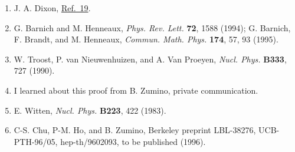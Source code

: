 \begin{enumerate}
\item {}\label{ch22-ref-21}
J. A. Dixon, \hyperref[ch22-ref-19]{Ref.~19}.

\item {}\label{ch22-ref-22}
G. Barnich and M. Henneaux, \emph{Phys. Rev. Lett.} \textbf{72}, 1588
(1994); G. Barnich, F. Brandt, and M. Henneaux,
\emph{Commun. Math. Phys.} \textbf{174}, 57, 93 (1995).

\item {}\label{ch22-ref-23}
W. Troost, P. van Nieuwenhuizen, and A. Van Proeyen,
\emph{Nucl. Phys.} \textbf{B333}, 727 (1990).

\item {}\label{ch22-ref-24}
I learned about this proof from B. Zumino, private communication.

\item {}\label{ch22-ref-25}
E. Witten, \emph{Nucl. Phys.} \textbf{B223}, 422 (1983).

\item {}\label{ch22-ref-26}
C-S. Chu, P-M. Ho, and B. Zumino, Berkeley preprint LBL-38276,
UCB-PTH-96/05, hep-th/9602093, to be published (1996).
\end{enumerate}
